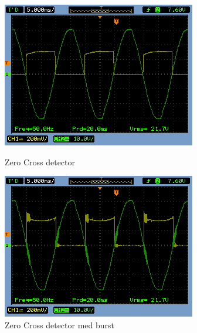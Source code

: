 \begin{figure}[H]
  \begin{minipage}{0.45\textwidth}
    \centering
      \includegraphics[width=\textwidth]{billeder/HWTest/Encoder/Encoder_zerocross}
      \caption{Zero Cross detector}
    \label{fig:ZC_UB}
  \end{minipage}
  \hspace{0.1\textwidth}
  \begin{minipage}{0.45\textwidth}
    \centering
      \includegraphics[width=\textwidth]{billeder/HWTest/Encoder/Encoder_zerocross_burst}
      \caption{Zero Cross detector med burst}
    \label{fig:ZC_MB}
  \end{minipage}
\end{figure}


